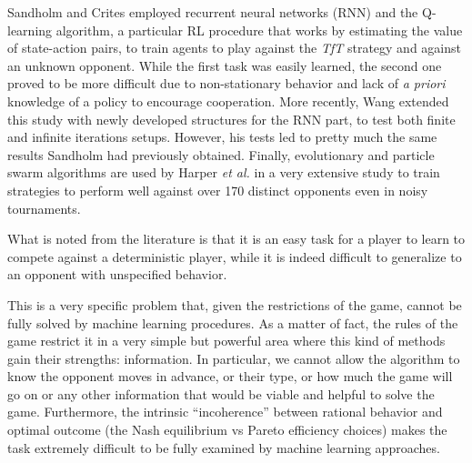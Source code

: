 \documentclass[journal,10pt,twoside]{IEEEtran}
\begin{document}
Sandholm and Crites \cite{sandholmRL} employed recurrent neural networks (RNN) and the Q-learning algorithm, a particular RL procedure that works by estimating the value of state-action pairs, to train agents to play against the \textit{TfT} strategy and against an unknown opponent. While the first task was easily learned, the second one proved to be more difficult due to non-stationary behavior and lack of \textit{a priori} knowledge of a policy to encourage cooperation.
More recently, Wang \cite{kedaoRL} extended this study with newly developed structures for the RNN part, to test both finite and infinite iterations setups. However, his tests led to pretty much the same results Sandholm had previously obtained.
Finally, evolutionary and particle swarm algorithms are used by Harper \textit{et al.} in a very extensive study \cite{plosRLdominant} to train strategies to perform well against over 170 distinct opponents even in noisy tournaments.

What is noted from the literature is that it is an easy task for a player to learn to compete against a deterministic player, while it is indeed difficult to generalize to an opponent with unspecified behavior.

This is a very specific problem that, given the restrictions of the game, cannot be fully solved by machine learning procedures. As a matter of fact, the rules of the game restrict it in a very simple but powerful area where this kind of methods gain their strengths: information. In particular, we cannot allow the algorithm to know the opponent moves in advance, or their type, or how much the game will go on or any other information that would be viable and helpful to solve the game. Furthermore, the intrinsic ``incoherence'' between rational behavior and optimal outcome (the Nash equilibrium vs Pareto efficiency choices) makes the task extremely difficult to be fully examined by machine learning approaches.
\end{document}
